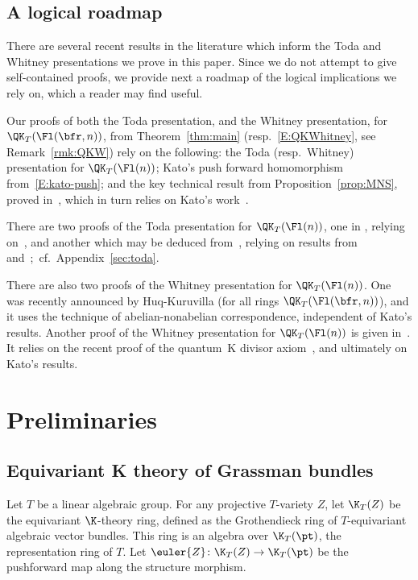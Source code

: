 \subsection{A logical roadmap} There are several recent results in the literature which inform the Toda and Whitney
presentations we prove in this paper.
Since we do not attempt to give self-contained
proofs, we provide next a roadmap of the logical
implications we rely on, which a reader may find useful.

Our proofs of both the Toda presentation, and the Whitney presentation,
for $\QK_T(\Fl(\bfr,n))$, from Theorem~\ref{thm:main} (resp.\ \eqref{E:QKWhitney}, see Remark~\ref{rmk:QKW})
rely on the following: the Toda (resp.\ Whitney) presentation for $\QK_T(\Fl(n))$;
Kato's push forward homomorphism from~\eqref{E:kato-push}; and the key
technical result from Proposition~\ref{prop:MNS}, proved in~\cite{maeno.naito.sagaki:QKideal},
which in turn relies on Kato's work~\cite{kato:loop}.

There are two proofs of the Toda presentation for $\QK_T(\Fl(n))$, one in
\cite{maeno.naito.sagaki:QKideal}, relying on~\cite{kato:loop}, and another
which may be deduced from~\cite{act:2017}, relying on results from
\cite{givental_lee} and~\cite{Iritani:2013qka};~cf.~Appendix~\ref{sec:toda}.

There are also two proofs of the Whitney presentation for $\QK_T(\Fl(n))$.
One was recently announced by Huq-Kuruvilla
\cite{huq2024quantum} (for all rings $\QK_T(\Fl(\bfr,n))$), and
it uses the technique of abelian-nonabelian correspondence, independent
of Kato's results. Another proof of the Whitney presentation for
 $\QK_T(\Fl(n))$ is given in~\cite[Section~6]{GMSXZZ:QKW}.
It relies on the recent proof of the quantum~K divisor axiom~\cite{LNSX:QKdiv},
and ultimately on Kato's results.

\section{Preliminaries}
\subsection{Equivariant K theory of Grassman bundles}
Let $T$ be a linear algebraic group. For any projective $T$-variety $Z$,
let $\K_T(Z)$ be the equivariant $\K$-theory
ring, defined as the Grothendieck ring of $T$-equivariant algebraic vector
bundles. This ring is an algebra over $\K_T(\pt)$, the representation ring of
$T$. Let $\euler{Z}\colon \K_T(Z) \to \K_T(\pt)$ be the pushforward map along the
structure morphism.

